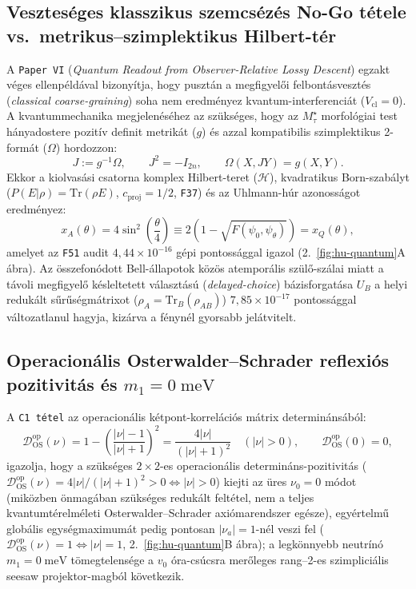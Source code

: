 \documentclass[11pt,a4paper]{article}
\begin{document}
\subsection{Veszteséges klasszikus szemcsézés No-Go tétele vs.\ metrikus--szimplektikus Hilbert-tér}

A \texttt{Paper VI} (\emph{Quantum Readout from Observer-Relative Lossy Descent}) egzakt véges ellenpéldával bizonyítja, hogy pusztán a megfigyelői felbontásvesztés (\emph{classical coarse-graining}) soha nem eredményez kvantum-interferenciát ($V_{\mathrm{cl}}=0$). A kvantummechanika megjelenéséhez az szükséges, hogy az $M_\tau^\star$ morfológiai test hányadostere pozitív definit metrikát ($g$) és azzal kompatibilis szimplektikus 2-formát ($\Omega$) hordozzon:
\begin{equation}
J := g^{-1}\Omega,\qquad J^2 = -I_{2n},\qquad \Omega(X,JY) = g(X,Y).
\end{equation}
Ekkor a kiolvasási csatorna komplex Hilbert-teret ($\mathcal{H}$), kvadratikus Born-szabályt ($P(E|\rho)=\mathrm{Tr}(\rho E)$, $c_{\mathrm{proj}}=1/2$, \texttt{F37}) és az Uhlmann-húr azonosságot eredményez:
\begin{equation}
x_A(\theta) = 4\sin^2\!\left(\frac{\theta}{4}\right) \equiv 2\!\left(1 - \sqrt{F(\psi_0,\psi_\theta)}\right) = x_Q(\theta),
\end{equation}
amelyet az \texttt{F51} audit $4{,}44\times 10^{-16}$ gépi pontossággal igazol (2.~\ref{fig:hu-quantum}A ábra). Az összefonódott Bell-állapotok közös atemporális szülő-szálai miatt a távoli megfigyelő késleltetett választású (\emph{delayed-choice}) bázisforgatása $U_B$ a helyi redukált sűrűségmátrixot ($\rho_A=\mathrm{Tr}_B(\rho_{AB})$) $7{,}85\times 10^{-17}$ pontossággal változatlanul hagyja, kizárva a fénynél gyorsabb jelátvitelt.

\subsection{Operacionális Osterwalder--Schrader reflexiós pozitivitás és $m_1 = 0\;\mathrm{meV}$}

A \texttt{C1 tétel} az operacionális kétpont-korrelációs mátrix determinánsából:
\begin{equation}
\mathcal{D}_{\mathrm{OS}}^{\mathrm{op}}(\nu)
= 1 - \left(\frac{|\nu|-1}{|\nu|+1}\right)^{\!2} = \frac{4|\nu|}{(|\nu|+1)^2}\quad(|\nu|>0),\qquad \mathcal{D}_{\mathrm{OS}}^{\mathrm{op}}(0)=0,
\end{equation}
igazolja, hogy a szükséges $2\times 2$-es operacionális determináns-pozitivitás ($\mathcal{D}_{\mathrm{OS}}^{\mathrm{op}}(\nu)=4|\nu|/(|\nu|+1)^2>0\iff|\nu|>0$) kiejti az üres $\nu_0=0$ módot (miközben önmagában szükséges redukált feltétel, nem a teljes kvantumtérelméleti Osterwalder--Schrader axiómarendszer egésze), egyértelmű globális egységmaximumát pedig pontosan $|\nu_a|=1$-nél veszi fel ($\mathcal{D}_{\mathrm{OS}}^{\mathrm{op}}(\nu)=1\iff|\nu|=1$, 2.~\ref{fig:hu-quantum}B ábra); a legkönnyebb neutrínó $m_1=0\;\mathrm{meV}$ tömegtelensége a $v_0$ óra-csúcsra merőleges rang--2-es szimpliciális seesaw projektor-magból következik.
\end{document}
